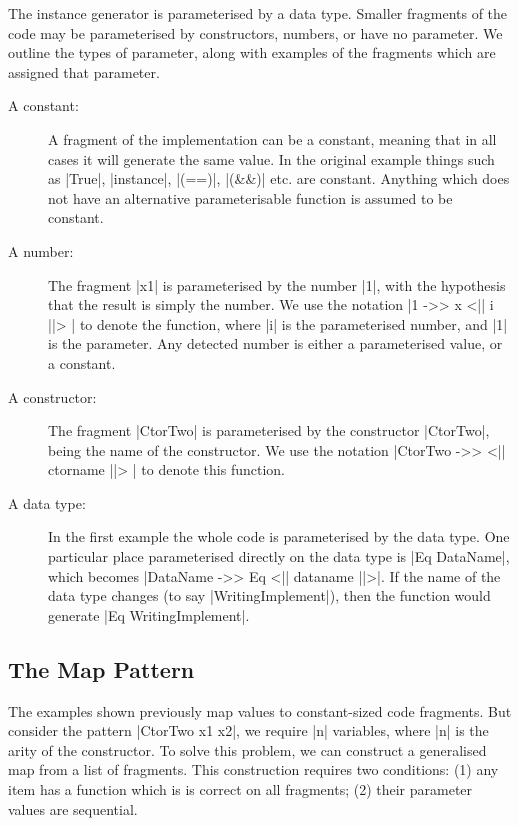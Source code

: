 \documentclass{llncs}
\begin{document}
The instance generator is parameterised by a data type. Smaller fragments of the code may be parameterised by constructors, numbers, or have no parameter. We outline the types of parameter, along with examples of the fragments which are assigned that parameter.

\begin{description}
\item[A constant:] A fragment of the implementation can be a constant, meaning that in all cases it will generate the same value. In the original example things such as |True|, |instance|, |(==)|, |(&&)| etc. are constant. Anything which does not have an alternative parameterisable function is assumed to be constant.

\item[A number:] The fragment |x1| is parameterised by the number |1|, with the hypothesis that the result is simply the number. We use the notation |1 ->> x <|| i ||> | to denote the function, where |i| is the parameterised number, and |1| is the parameter. Any detected number is either a parameterised value, or a constant.

\item[A constructor:] The fragment |CtorTwo| is parameterised by the constructor |CtorTwo|, being the name of the constructor. We use the notation |CtorTwo ->> <|| ctorname ||> | to denote this function.

\item[A data type:] In the first example the whole code is parameterised by the data type. One particular place parameterised directly on the data type is |Eq DataName|, which becomes |DataName ->> Eq <|| dataname ||>|. If the name of the data type changes (to say |WritingImplement|), then the function would generate |Eq WritingImplement|.
\end{description}

\subsection{The Map Pattern}
\label{sec:induction}

The examples shown previously map values to constant-sized code fragments. But consider the pattern |CtorTwo x1 x2|, we require |n| variables, where |n| is the arity of the constructor. To solve this problem, we can construct a generalised map from a list of fragments. This construction requires two conditions: (1) any item has a function which is is correct on all fragments; (2) their parameter values are sequential.
\end{document}
